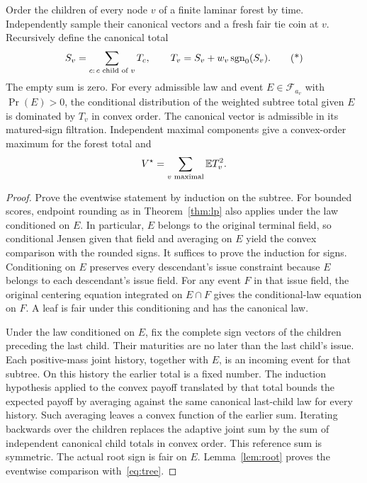 \begin{theorem}\label{thm:tree}
Order the children of every node $v$ of a finite laminar forest by time.
Independently sample their canonical vectors and a fresh fair tie coin
at $v$. Recursively define the canonical total
\[
 S_v=\sum_{c:\,c\text{ child of }v}T_c,\qquad
 T_v=S_v+w_v\operatorname{sgn}_0(S_v).
 \tag{*}\label{eq:tree}
\]
The empty sum is zero. For every admissible law and event
$E\in\mathcal F_{a_v}$ with $\Pr(E)>0$, the conditional distribution
of the weighted subtree total given $E$ is dominated by $T_v$ in
convex order. The canonical vector is admissible in its matured-sign
filtration. Independent maximal components give a convex-order
maximum for the forest total and
\[
 V^\star=\sum_{v\text{ maximal}}\mathbb E T_v^2.
\]
\end{theorem}
\begin{proof}
Prove the eventwise statement by induction on the subtree. For bounded
scores, endpoint rounding as in Theorem~\ref{thm:lp} also applies
under the law conditioned on $E$. In particular, $E$ belongs to the
original terminal field, so conditional Jensen given that field and
averaging on $E$ yield the convex comparison with the rounded signs.
It suffices to prove the induction for signs. Conditioning on $E$
preserves every descendant's issue constraint because $E$ belongs to
each descendant's issue field. For any event $F$ in that issue field,
the original centering equation integrated on $E\cap F$ gives the
conditional-law equation on $F$.
A leaf is fair under this conditioning and has the canonical law.

Under the law conditioned on $E$, fix the complete sign vectors of
the children preceding the last child. Their maturities are no later
than the last child's issue. Each positive-mass joint history, together
with $E$, is an incoming event for that subtree. On this history the
earlier total is a fixed number. The induction hypothesis applied to
the convex payoff translated by that total bounds the expected payoff
by averaging against the same canonical last-child law for every
history. Such averaging leaves a convex function of the earlier sum.
Iterating backwards over the children replaces the adaptive joint sum
by the sum of independent canonical child totals in convex order.
This reference sum is symmetric. The actual root sign is fair on $E$.
Lemma~\ref{lem:root} proves the eventwise comparison with~\eqref{eq:tree}.


\end{proof}
